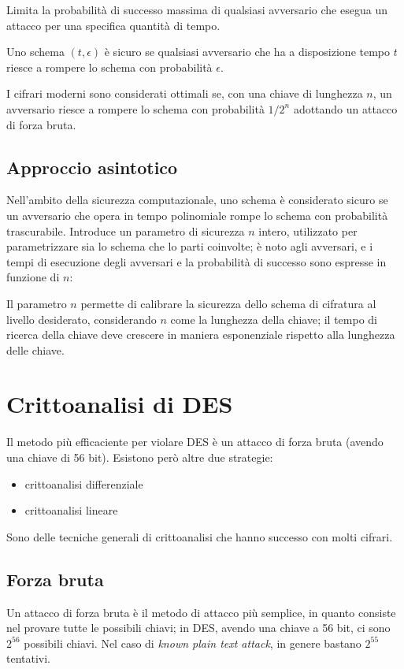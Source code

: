 Limita la probabilità di successo massima di qualsiasi avversario che esegua un attacco per una specifica quantità di tempo.

\noindent Uno schema $(t, \epsilon)$ è sicuro se qualsiasi avversario che ha a disposizione tempo $t$ riesce a rompere lo schema con 
probabilità $\epsilon$.

\noindent I cifrari moderni sono considerati ottimali se, con una chiave di lunghezza $n$, un avversario riesce a rompere lo schema con probabilità $1/2^n$ adottando un 
attacco di forza bruta.

\subsection{Approccio asintotico}
Nell'ambito della sicurezza computazionale, uno schema è considerato sicuro se un avversario che opera in tempo polinomiale rompe lo schema 
con probabilità trascurabile. Introduce un parametro di sicurezza $n$ intero, utilizzato per parametrizzare sia lo schema che lo parti coinvolte;
è noto agli avversari, e i tempi di esecuzione degli avversari e la probabilità di successo sono espresse in funzione di $n$:

\noindent Il parametro $n$ permette di calibrare la sicurezza dello schema di cifratura al livello desiderato, considerando $n$ come la 
lunghezza della chiave; il tempo di ricerca della chiave deve crescere in maniera esponenziale rispetto alla lunghezza delle chiave.

\section{Crittoanalisi di DES}
Il metodo più efficaciente per violare DES è un attacco di forza bruta (avendo una chiave di 56 bit). Esistono però altre due strategie:
\begin{itemize}
    \item crittoanalisi differenziale
    \item crittoanalisi lineare
\end{itemize}

\noindent Sono delle tecniche generali di crittoanalisi che hanno successo con molti cifrari.

\subsection{Forza bruta}
Un attacco di forza bruta è il metodo di attacco più semplice, in quanto consiste nel provare tutte le possibili chiavi; in DES, avendo una chiave 
a 56 bit, ci sono $2^56$ possibili chiavi. Nel caso di \textit{known plain text attack}, in genere bastano $2^55$ tentativi.

